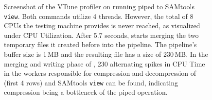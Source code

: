 \begin{figure}
\caption{Screenshot of the VTune profiler on running \sort piped to SAMtools \texttt{view}. Both commands utilize 4 threads. However, the total of 8 CPUs the testing machine provides is never reached, as visualized under CPU Utilization. After 5.7 seconds, \sort starts merging the two temporary files it created before into the pipeline. The pipeline's buffer size is 1\,MB and the resulting file has a size of 230\,MB. In the merging and writing phase of \sort, 230 alternating spikes in CPU Time in the workers responsible for compression and decompression of \sort (first 4 rows) and SAMtools \texttt{view} can be found, indicating compression being a bottleneck of the piped operation.} \label{fig1}
\end{figure}



\newpage